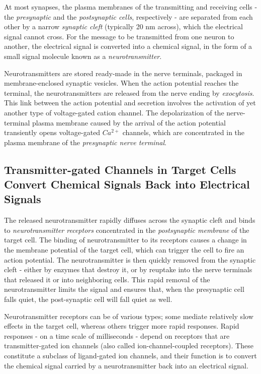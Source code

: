 At most synapses, the plasma membranes of the transmitting and
receiving cells - the \textit{presynaptic} and the \textit{postsynaptic cells}, respectively -
are separated from each other by a narrow \textit{synaptic cleft} (typically 20 nm
across), which the electrical signal cannot cross. For the
message to be transmitted from one neuron to another, the electrical
signal is converted into a chemical signal, in the form of a small signal
molecule known as a \textit{neurotransmitter}.

Neurotransmitters are stored ready-made in the nerve terminals, packaged
in membrane-enclosed synaptic vesicles.
When the action potential reaches the terminal, the neurotransmitters
are released from the nerve ending by \textit{exocytosis}. This link between the
action potential and secretion involves the
activation of yet another type of voltage-gated cation channel. The
depolarization of the nerve-terminal plasma membrane caused by the
arrival of the action potential transiently opens voltage-gated $Ca^{2+}$ channels,
which are concentrated in the plasma membrane of the \textit{presynaptic nerve terminal}.

\subsection{Transmitter-gated Channels in Target Cells Convert Chemical Signals Back into Electrical Signals}

The released neurotransmitter rapidly diffuses across the synaptic cleft
and binds to \textit{neurotransmitter receptors} concentrated in the \textit{postsynaptic
membrane} of the target cell. The binding of neurotransmitter to its
receptors causes a change in the membrane potential of the target cell,
which can trigger the cell to fire an action potential. The neurotransmitter
is then quickly removed from the synaptic cleft - either by enzymes that
destroy it, or by reuptake into the nerve terminals that released it or into
neighboring cells. This rapid removal of the neurotransmitter limits the
signal and ensures that, when the presynaptic cell falls quiet, the post-synaptic
cell will fall quiet as well.

Neurotransmitter receptors can be of various types; some mediate relatively
slow effects in the target cell, whereas others trigger more rapid
responses. Rapid responses - on a time scale of milliseconds - depend
on receptors that are transmitter-gated ion channels (also called ion-channel-coupled
receptors). These constitute a subclass of ligand-gated ion
channels, and their function is to convert the chemical signal carried by a
neurotransmitter back into an electrical signal.

